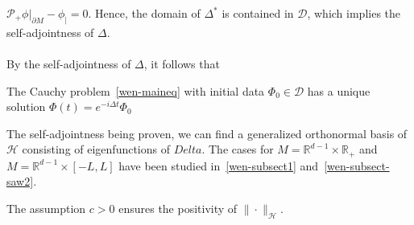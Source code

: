 $\mathcal{P}_+\phi\vert_{\partial M} - \phi_| = 0$.
Hence, the domain of $\Delta^*$ is contained in $\mathcal{D}$, which implies the self-adjointness of $\Delta$.\\\\
By the self-adjointness of $\Delta$, it follows that 
\begin{proposition}\label{wen-propwellposedness}
The Cauchy problem~\cref{wen-maineq} with initial data $\Phi_0\in\mathcal{D}$ has a unique solution $\Phi(t) = e^{-i\Delta t}\Phi_0 $
\end{proposition}
The self-adjointness being proven, 
we can find a generalized orthonormal basis of $\mathcal{H}$ consisting of eigenfunctions of $Delta$.
The cases for $M = \mathbb{R}^{d-1}\times\mathbb{R}_+$ and $M = \mathbb{R}^{d-1}\times [-L, L]$ have been studied in~\cref{wen-subsect1} and~\cref{wen-subsect-saw2}.
\begin{remark}
The assumption $c>0$ ensures the positivity of $\|\cdot\|_\mathcal{H}$. 
\end{remark}
